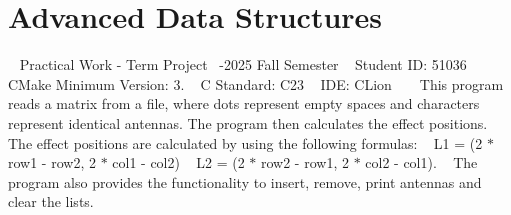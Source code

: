 \chapter{Advanced Data Structures}
\hypertarget{index}{}\label{index}
~\newline
Practical Work -\/ Term Project ~-\/2025 Fall Semester ~\newline
Student ID\+: 51036 ~\newline
 ~\newline
CMake Minimum Version\+: 3. ~\newline
C Standard\+: C23 ~\newline
IDE\+: CLion ~\newline
 ~\newline
This program reads a matrix from a file, where dots represent empty spaces and characters represent identical antennas. The program then calculates the effect positions. The effect positions are calculated by using the following formulas\+: ~\newline
L1 = (2 \texorpdfstring{$\ast$}{*} row1 -\/ row2, 2 \texorpdfstring{$\ast$}{*} col1 -\/ col2) ~\newline
L2 = (2 \texorpdfstring{$\ast$}{*} row2 -\/ row1, 2 \texorpdfstring{$\ast$}{*} col2 -\/ col1). ~\newline
The program also provides the functionality to insert, remove, print antennas and clear the lists. 